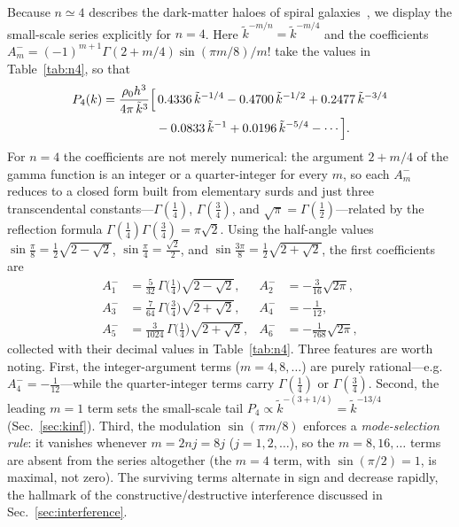 \documentclass[aps,prd,onecolumn]{revtex4-2}
\newcommand{\kt}{\tilde{k}}          %
\begin{document}
Because $n\simeq4$ describes the dark-matter haloes of spiral
galaxies~\cite{Navarro2004,Merritt2006}, we display the small-scale series
explicitly for $n=4$.  Here $\kt^{-m/n}=\kt^{-m/4}$ and the coefficients
$A_m^{-}=(-1)^{m+1}\Gamma(2+m/4)\sin(\pi m/8)/m!$ take the values in
Table~\ref{tab:n4}, so that
\begin{align}
P_{4}(k)=\frac{\rho_0 h^3}{4\pi\,\kt^{3}}\Bigl[
&\,0.4336\,\kt^{-1/4}
-0.4700\,\kt^{-1/2}
+0.2477\,\kt^{-3/4}\nonumber\\
&-0.0833\,\kt^{-1}
+0.0196\,\kt^{-5/4}-\cdots\Bigr].
\label{eq:n4series}
\end{align}
For $n=4$ the coefficients are not merely numerical: the argument
$2+m/4$ of the gamma function is an integer or a quarter-integer for every
$m$, so each $A_m^{-}$ reduces to a closed form built from elementary surds
and just three transcendental constants---$\Gamma(\tfrac14)$,
$\Gamma(\tfrac34)$, and $\sqrt\pi=\Gamma(\tfrac12)$---related by the
reflection formula $\Gamma(\tfrac14)\Gamma(\tfrac34)=\pi\sqrt2$.  Using the
half-angle values $\sin\tfrac{\pi}{8}=\tfrac12\sqrt{2-\sqrt2}$,
$\sin\tfrac{\pi}{4}=\tfrac{\sqrt2}{2}$, and
$\sin\tfrac{3\pi}{8}=\tfrac12\sqrt{2+\sqrt2}$, the first coefficients are
\begin{align}
A_1^{-}&=\tfrac{5}{32}\,\Gamma\!\bigl(\tfrac14\bigr)\sqrt{2-\sqrt2},
& A_2^{-}&=-\tfrac{3}{16}\sqrt{2\pi},\nonumber\\
A_3^{-}&=\tfrac{7}{64}\,\Gamma\!\bigl(\tfrac34\bigr)\sqrt{2+\sqrt2},
& A_4^{-}&=-\tfrac{1}{12},\nonumber\\
A_5^{-}&=\tfrac{3}{1024}\,\Gamma\!\bigl(\tfrac14\bigr)\sqrt{2+\sqrt2},
& A_6^{-}&=-\tfrac{1}{768}\sqrt{2\pi},
\label{eq:n4exact}
\end{align}
collected with their decimal values in Table~\ref{tab:n4}.  Three features
are worth noting.  First, the integer-argument terms ($m=4,8,\dots$) are
purely rational---e.g.\ $A_4^{-}=-\tfrac1{12}$---while the
quarter-integer terms carry $\Gamma(\tfrac14)$ or $\Gamma(\tfrac34)$.
Second, the leading $m=1$ term sets the small-scale tail
$P_4\propto\kt^{-(3+1/4)}=\kt^{-13/4}$ (Sec.~\ref{sec:kinf}).  Third, the
modulation $\sin(\pi m/8)$ enforces a \emph{mode-selection rule}: it
vanishes whenever $m=2nj=8j$ ($j=1,2,\dots$), so the $m=8,16,\dots$ terms
are absent from the series altogether (the $m=4$ term, with
$\sin(\pi/2)=1$, is maximal, not zero).  The surviving terms alternate in
sign and decrease rapidly, the hallmark of the constructive/destructive
interference discussed in Sec.~\ref{sec:interference}.
\end{document}
